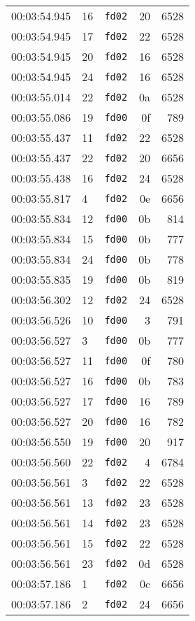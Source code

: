 \documentclass{article}
\begin{document}
\begin{longtable}{lllrr}
00:03:54.945 & 16 & \texttt{fd02} & 20 & 6528 \\
00:03:54.945 & 17 & \texttt{fd02} & 22 & 6528 \\
00:03:54.945 & 20 & \texttt{fd02} & 16 & 6528 \\
00:03:54.945 & 24 & \texttt{fd02} & 16 & 6528 \\
00:03:55.014 & 22 & \texttt{fd02} & 0a & 6528 \\
00:03:55.086 & 19 & \texttt{fd00} & 0f & 789 \\
00:03:55.437 & 11 & \texttt{fd02} & 22 & 6528 \\
00:03:55.437 & 22 & \texttt{fd02} & 20 & 6656 \\
00:03:55.438 & 16 & \texttt{fd02} & 24 & 6528 \\
00:03:55.817 & 4 & \texttt{fd02} & 0e & 6656 \\
00:03:55.834 & 12 & \texttt{fd00} & 0b & 814 \\
00:03:55.834 & 15 & \texttt{fd00} & 0b & 777 \\
00:03:55.834 & 24 & \texttt{fd00} & 0b & 778 \\
00:03:55.835 & 19 & \texttt{fd00} & 0b & 819 \\
00:03:56.302 & 12 & \texttt{fd02} & 24 & 6528 \\
00:03:56.526 & 10 & \texttt{fd00} & 3 & 791 \\
00:03:56.527 & 3 & \texttt{fd00} & 0b & 777 \\
00:03:56.527 & 11 & \texttt{fd00} & 0f & 780 \\
00:03:56.527 & 16 & \texttt{fd00} & 0b & 783 \\
00:03:56.527 & 17 & \texttt{fd00} & 16 & 789 \\
00:03:56.527 & 20 & \texttt{fd00} & 16 & 782 \\
00:03:56.550 & 19 & \texttt{fd00} & 20 & 917 \\
00:03:56.560 & 22 & \texttt{fd02} & 4 & 6784 \\
00:03:56.561 & 3 & \texttt{fd02} & 22 & 6528 \\
00:03:56.561 & 13 & \texttt{fd02} & 23 & 6528 \\
00:03:56.561 & 14 & \texttt{fd02} & 23 & 6528 \\
00:03:56.561 & 15 & \texttt{fd02} & 22 & 6528 \\
00:03:56.561 & 23 & \texttt{fd02} & 0d & 6528 \\
00:03:57.186 & 1 & \texttt{fd02} & 0c & 6656 \\
00:03:57.186 & 2 & \texttt{fd02} & 24 & 6656 \\

\end{longtable}
\end{document}
